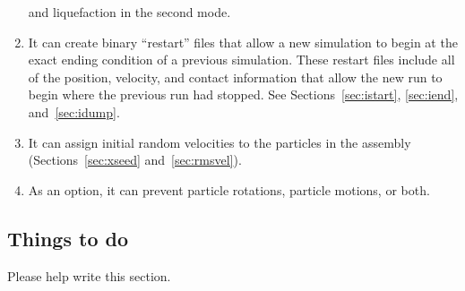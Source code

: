 \documentclass[letterpaper,11pt]{article}
\begin{document}
\begin{enumerate}
and liquefaction in the second mode.
\item
It can create binary ``restart'' files that allow a new
simulation to begin at the exact ending condition
of a previous simulation.  These restart files include all of the position, 
velocity, and contact information that allow the new run to begin
where the previous run had stopped.
See Sections~\ref{sec:istart}, \ref{sec:iend}, and~\ref{sec:idump}.
\item
It can assign initial random velocities to the particles in
the assembly (Sections~\ref{sec:xseed} and~\ref{sec:rmsvel}).
\item
As an option, it can prevent particle rotations, particle motions, or both.
\end{enumerate}
%
%
\subsection{Things to do}
Please help write this section.
%
%
%
\end{document}
